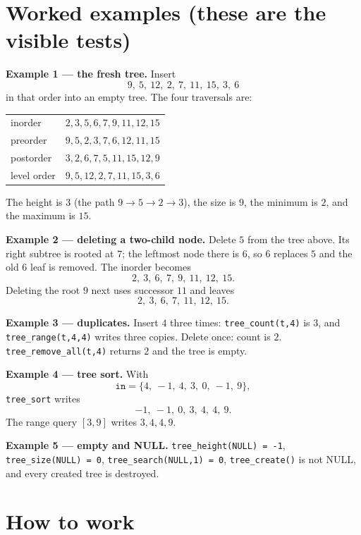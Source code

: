 \documentclass[11pt]{article}
\begin{document}
\section{Worked examples (these are the visible tests)}

\textbf{Example 1 --- the fresh tree.} Insert
\[
  9,\ 5,\ 12,\ 2,\ 7,\ 11,\ 15,\ 3,\ 6
\]
in that order into an empty tree. The four traversals are:
\begin{center}
{\footnotesize
\begin{tabular}{l l}
  \toprule
  inorder   & $2,3,5,6,7,9,11,12,15$ \\
  preorder  & $9,5,2,3,7,6,12,11,15$ \\
  postorder & $3,2,6,7,5,11,15,12,9$ \\
  level order & $9,5,12,2,7,11,15,3,6$ \\
  \bottomrule
\end{tabular}}
\end{center}
The height is $3$ (the path $9\to5\to2\to3$), the size is $9$, the minimum is $2$, and the maximum is $15$.

\textbf{Example 2 --- deleting a two-child node.} Delete $5$ from the tree above. Its right subtree is rooted at $7$; the leftmost node there is $6$, so $6$ replaces $5$ and the old $6$ leaf is removed. The inorder becomes
\[
  2,\ 3,\ 6,\ 7,\ 9,\ 11,\ 12,\ 15.
\]
Deleting the root $9$ next uses successor $11$ and leaves
\[
  2,\ 3,\ 6,\ 7,\ 11,\ 12,\ 15.
\]

\textbf{Example 3 --- duplicates.} Insert $4$ three times: \texttt{tree\_count(t,4)} is $3$, and \texttt{tree\_range(t,4,4)} writes three copies. Delete once: count is $2$. \texttt{tree\_remove\_all(t,4)} returns $2$ and the tree is empty.

\textbf{Example 4 --- tree sort.} With
\[
  \texttt{in} = \{4,\ -1,\ 4,\ 3,\ 0,\ -1,\ 9\},
\]
\texttt{tree\_sort} writes
\[
  -1,\ -1,\ 0,\ 3,\ 4,\ 4,\ 9.
\]
The range query $[3,9]$ writes $3,4,4,9$.

\textbf{Example 5 --- empty and NULL.} \texttt{tree\_height(NULL) = -1}, \texttt{tree\_size(NULL) = 0}, \texttt{tree\_search(NULL,1) = 0}, \texttt{tree\_create()} is not NULL, and every created tree is destroyed.

\section{How to work}
\end{document}
